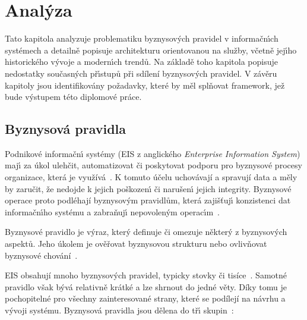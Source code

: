 
\chapter{Anal\'yza}\label{ch:analyza}

Tato kapitola analyzuje problematiku byznysov\'ych pravidel v informačn\'{\i}ch systémech
a detailně popisuje architekturu orientovanou na služby, včetně jej\'{\i}ho historického
v\'yvoje a modern\'{\i}ch trendů. Na základě toho kapitola popisuje nedostatky
současn\'ych př\'{\i}stupů při sdílení byznysových pravidel. V závěru kapitoly jsou
identifikovány požadavky, které by měl splňovat framework, jež bude v\'ystupem této diplomové práce.

\section{Byznysová pravidla}\label{sec:business-rules}

Podnikové informačn\'{\i} systémy (\gls{EIS} z anglického \textit{Enterprise Information System})
maj\'{\i} za úkol ulehčit, automatizovat či poskytovat podporu pro byznysové procesy organizace,
která je využívá~\cite{dumas2005process}. K tomuto účelu uchovávají a spravují data a měly by zaručit,
že nedojde k jejich poškozen\'{\i} či narušen\'{\i} jejich integrity. Byznysové operace proto
podléhají byznysov\'ym pravidlům, která zajišťuj\'{\i} konzistenci dat informačn\'{\i}ho systému a
zabraňuj\'{\i} nepovolen\'ym operac\'{\i}m~\cite{cemus2015automated}.

\begin{definition}
    Byznysové pravidlo je výraz, který definuje či omezuje některý z byznysových aspektů.
    Jeho úkolem je ověřovat byznysovou strukturu nebo ovlivňovat byznysové chování~\cite{morgan2002business}.
\end{definition}


\gls{EIS} obsahují mnoho byznysových pravidel, typicky stovky či tisíce~\cite{morgan2002business}.
Samotné pravidlo však bývá relativně krátké a lze shrnout do jedné věty. Díky tomu je pochopitelné
pro všechny zainteresované strany, které se podílejí na návrhu a vývoji systému.
Byznysová pravidla jsou dělena do tř\'{\i} skupin~\cite{cemus2014aspect}:

